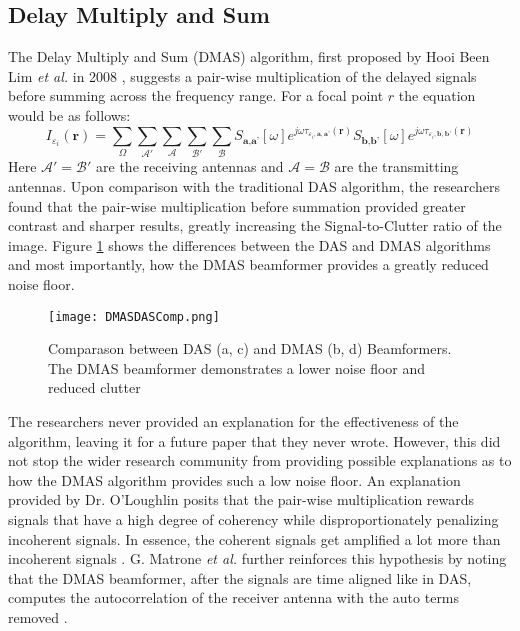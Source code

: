 \subsection{Delay Multiply and Sum}
The Delay Multiply and Sum (DMAS) algorithm, first proposed by Hooi Been Lim \textit{et al.} in 2008
\cite{h.beenlimConfocalMicrowaveImaging2008}, suggests a pair-wise multiplication of the delayed signals before summing
across the frequency range. For a focal point $r$ the equation would be as follows:
\begingroup
\large
\begin{equation}
    I_{\varepsilon_i}(\textbf{r}) = \sum_{\Omega}\sum_{\mathcal{A}'}\sum_{\mathcal{A}}\sum_{\mathcal{B}'}\sum_{\mathcal{B}} S_{\textbf{a}, \textbf{a'}}[\omega]e^{j\omega \tau_{\varepsilon_i, \textbf{a}, \textbf{a'}}(\textbf{r})} S_{\textbf{b}, \textbf{b'}}[\omega]e^{j\omega \tau_{\varepsilon_i, \textbf{b}, \textbf{b'}}(\textbf{r})}
    \label{eq:DMASBeamformer}
\end{equation}
\endgroup
Here $\mathcal{A}' = \mathcal{B}'$ are the receiving antennas and $\mathcal{A} = \mathcal{B}$ are the transmitting
antennas. Upon comparison with the traditional DAS algorithm, the researchers found that the pair-wise multiplication
before summation provided greater contrast and sharper results, greatly increasing the Signal-to-Clutter ratio of the
image. Figure \ref{fig:DMASDASComp} shows the differences between the DAS and DMAS algorithms and most
importantly, how the DMAS beamformer provides a greatly reduced noise floor.
\begin{figure}[!h]
    \texttt{[image: DMASDASComp.png]}
    \centering
    \caption{Comparason between DAS (a, c) and DMAS (b, d) Beamformers. The DMAS beamformer demonstrates a lower noise floor and reduced clutter}
    \label{fig:DMASDASComp}
\end{figure}
The researchers never provided an explanation for the effectiveness of the algorithm, leaving it for a future
paper that they never wrote. However, this did not stop the wider research community from providing possible
explanations as to how the DMAS algorithm provides such a low noise floor. An explanation provided by Dr. O'Loughlin
posits that the pair-wise multiplication rewards signals that have a high degree of coherency while disproportionately
penalizing incoherent signals. In essence, the coherent signals get amplified a lot more than incoherent signals
\cite{oloughlinComparingRadarBasedBreast2019}. G. Matrone \textit{et al.} further reinforces this hypothesis by noting that the DMAS beamformer,
after the signals are time aligned like in DAS, computes the autocorrelation of the receiver antenna with the auto
terms removed \cite{g.matroneDelayMultiplySum2015}.

